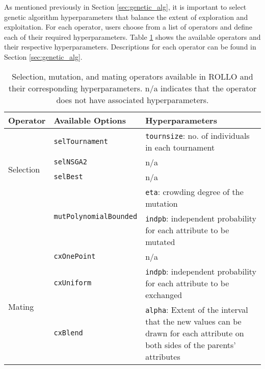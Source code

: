 As mentioned previously in Section \ref{sec:genetic_alg}, it is important to 
select genetic algorithm hyperparameters that balance the extent of exploration 
and exploitation.
For each operator, users choose from a list of operators and define each
of their required hyperparameters. 
Table \ref{tab:deap_operators} shows the available operators and their respective 
hyperparameters. 
Descriptions for each operator can be found in Section \ref{sec:genetic_alg}.
\begin{table}[htbp]
    \centering
    \onehalfspacing
    \caption{Selection, mutation, and mating operators available in 
    \acrfull{ROLLO} and their corresponding hyperparameters. n/a indicates that 
    the operator does not have associated hyperparameters. }
	\label{tab:deap_operators}
    \footnotesize
    \begin{tabular}{l|p{}|p{}}
    \hline
    \textbf{Operator} & \textbf{Available Options} & \textbf{Hyperparameters} \\ \hline
    \multirow{4}{1cm}{Selection} & \texttt{selTournament} & \texttt{tournsize}: no. of individuals in each tournament\\ \cline{2-3}
    & \texttt{selNSGA2} & n/a \\ \cline{2-3}
    & \texttt{selBest} & n/a \\ \hline
    \multirow{2}{1cm}{Mutation} & \multirow{2}{2cm}{\texttt{mutPolynomialBounded}} & \texttt{eta}: crowding degree of the mutation\\  
    && \texttt{indpb}: independent probability for each attribute to be mutated\\ \hline
    \multirow{3}{1cm}{Mating} & \texttt{cxOnePoint} & n/a \\ \cline{2-3}
    & \texttt{cxUniform} & \texttt{indpb}: independent probability for each attribute to be exchanged\\ \cline{2-3}
    & \texttt{cxBlend} & \texttt{alpha}: Extent of the interval that the new values can be drawn for each attribute on both sides of the parents’ attributes\\ \hline
    \end{tabular}
    \end{table}

